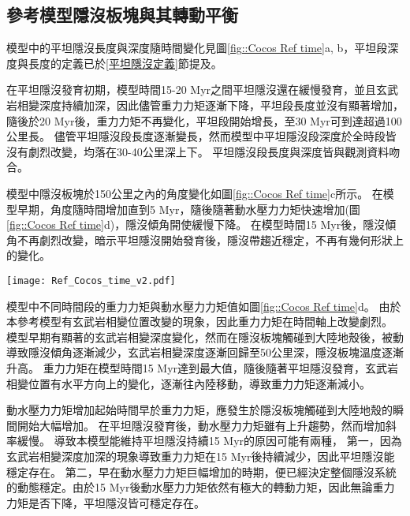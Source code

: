 \newpage
\subsection{參考模型隱沒板塊與其轉動平衡}
模型中的平坦隱沒長度與深度隨時間變化見圖\ref{fig::Cocos Ref time}a, b，平坦段深度與長度的定義已於\ref{平坦隱沒定義}節提及。

在平坦隱沒發育初期，模型時間15-20 Myr之間平坦隱沒還在緩慢發育，並且玄武岩相變深度持續加深，因此儘管重力力矩逐漸下降，平坦段長度並沒有顯著增加，隨後於20 Myr後，重力力矩不再變化，平坦段開始增長，至30 Myr可到達超過100公里長。
儘管平坦隱沒段長度逐漸變長，然而模型中平坦隱沒段深度於全時段皆沒有劇烈改變，均落在30-40公里深上下。
平坦隱沒段長度與深度皆與觀測資料吻合。

模型中隱沒板塊於150公里之內的角度變化如圖\ref{fig::Cocos Ref time}c所示。
在模型早期，角度隨時間增加直到5 Myr，隨後隨著動水壓力力矩快速增加(圖\ref{fig::Cocos Ref time}d)，隱沒傾角開使緩慢下降。
在模型時間15 Myr後，隱沒傾角不再劇烈改變，暗示平坦隱沒開始發育後，隱沒帶趨近穩定，不再有幾何形狀上的變化。

\begin{figure*}[hb]
    \centering
    \texttt{[image: Ref\_Cocos\_time\_v2.pdf]}
    \caption[墨西哥參考模型隱沒板塊狀態隨時間變化]{墨西哥參考模型隱沒板塊狀態隨時間變化。灰底為模型中之平坦隱沒時期。(a)參考模型平坦段長度隨時間變化(b)參考模型平坦段深度隨時間變化，灰虛線為\citealp{Manea2017}中提及之智利平坦隱沒平坦段深度約落在100公里深，淺藍色底框出95公里至105公里範圍。(c)參考模型隱沒板塊自海溝到深度150公里之傾角。(d)參考模型中重力力矩與吸力力矩隨時間變化。其中粉紅色線為重力力矩，深藍色線為吸力力矩。兩者皆有做1 Myr的移動平均。}
    \label{fig::Cocos Ref time}
\end{figure*}

模型中不同時間段的重力力矩與動水壓力力矩值如圖\ref{fig::Cocos Ref time}d。
由於本參考模型有玄武岩相變位置改變的現象，因此重力力矩在時間軸上改變劇烈。
模型早期有顯著的玄武岩相變深度變化，然而在隱沒板塊觸碰到大陸地殼後，被動導致隱沒傾角逐漸減少，玄武岩相變深度逐漸回歸至50公里深，隱沒板塊溫度逐漸升高。
重力力矩在模型時間15 Myr達到最大值，隨後隨著平坦隱沒發育，玄武岩相變位置有水平方向上的變化，逐漸往內陸移動，導致重力力矩逐漸減小。

動水壓力力矩增加起始時間早於重力力矩，應發生於隱沒板塊觸碰到大陸地殼的瞬間開始大幅增加。
在平坦隱沒發育後，動水壓力力矩雖有上升趨勢，然而增加斜率緩慢。
導致本模型能維持平坦隱沒持續15 Myr的原因可能有兩種，
第一，因為玄武岩相變深度加深的現象導致重力力矩在15 Myr後持續減少，因此平坦隱沒能穩定存在。
第二，早在動水壓力力矩巨幅增加的時期，便已經決定整個隱沒系統的動態穩定。由於15 Myr後動水壓力力矩依然有極大的轉動力矩，因此無論重力力矩是否下降，平坦隱沒皆可穩定存在。